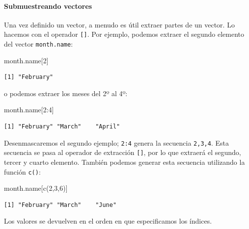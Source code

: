 \documentclass[
  letterpaper,
  DIV=11,
  numbers=noendperiod]{scrreprt}
\let\oldparagraph\paragraph
\renewcommand{\paragraph}[1]{\oldparagraph{#1}\mbox{}}
\newenvironment{Shaded}{\begin{snugshade}}{\end{snugshade}}
\newcommand{\DecValTok}[1]{\textcolor[rgb]{0.68,0.00,0.00}{#1}}
\newcommand{\FunctionTok}[1]{\textcolor[rgb]{0.28,0.35,0.67}{#1}}
\newcommand{\NormalTok}[1]{\textcolor[rgb]{0.00,0.23,0.31}{#1}}
\newcommand{\SpecialCharTok}[1]{\textcolor[rgb]{0.37,0.37,0.37}{#1}}
\begin{document}
\hypertarget{submuestreando-vectores}{%
\paragraph{Submuestreando vectores}\label{submuestreando-vectores}}

Una vez definido un vector, a menudo es útil extraer partes de un
vector. Lo hacemos con el operador \texttt{{[}{]}}. Por ejemplo, podemos
extraer el segundo elemento del vector \texttt{month.name}:

\begin{Shaded}
\begin{Highlighting}[]
\NormalTok{month.name[}\DecValTok{2}\NormalTok{]}
\end{Highlighting}
\end{Shaded}

\begin{verbatim}
[1] "February"
\end{verbatim}

o podemos extraer los meses del 2º al 4º:

\begin{Shaded}
\begin{Highlighting}[]
\NormalTok{month.name[}\DecValTok{2}\SpecialCharTok{:}\DecValTok{4}\NormalTok{]}
\end{Highlighting}
\end{Shaded}

\begin{verbatim}
[1] "February" "March"    "April"   
\end{verbatim}

Desenmascaremos el segundo ejemplo; \texttt{2:4} genera la secuencia
\texttt{2,3,4}. Esta secuencia se pasa al operador de extracción
\texttt{{[}{]}}, por lo que extraerá el segundo, tercer y cuarto
elemento. También podemos generar esta secuencia utilizando la función
\texttt{c()}:

\begin{Shaded}
\begin{Highlighting}[]
\NormalTok{month.name[}\FunctionTok{c}\NormalTok{(}\DecValTok{2}\NormalTok{,}\DecValTok{3}\NormalTok{,}\DecValTok{6}\NormalTok{)]}
\end{Highlighting}
\end{Shaded}

\begin{verbatim}
[1] "February" "March"    "June"    
\end{verbatim}

Los valores se devuelven en el orden en que especificamos los índices.
\end{document}
